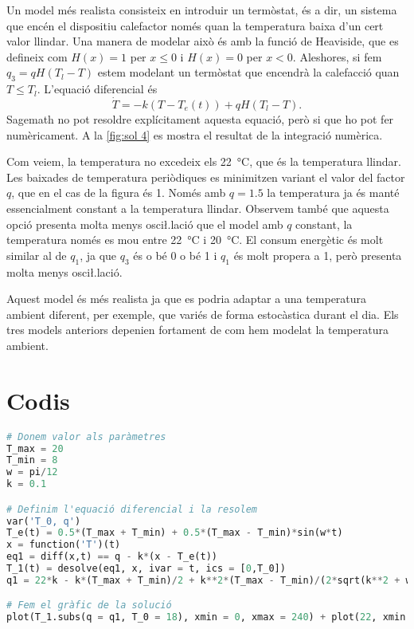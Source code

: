 \documentclass[12pt]{article}
\numberwithin{table}{section}
\numberwithin{figure}{section}
\numberwithin{equation}{section}
\begin{document}
Un model més realista consisteix en introduir un termòstat, és a dir, un sistema que encén el dispositiu calefactor només quan la temperatura baixa d'un cert valor llindar. Una manera de modelar això és amb la funció de Heaviside, que es defineix com \( H(x) = 1 \) per \( x \leq 0 \) i \( H(x) = 0 \) per \( x < 0 \). Aleshores, si fem \( q_3 = qH(T_l - T) \) estem modelant un termòstat que encendrà la calefacció quan \( T \leq T_l \). L'equació diferencial és
\begin{equation*}
	\dot{T} = -k(T - T_e(t)) + qH(T_l - T).
\end{equation*}
Sagemath no pot resoldre explícitament aquesta equació, però si que ho pot fer numèricament. A la \cref{fig:sol 4} es mostra el resultat de la integració numèrica. 

Com veiem, la temperatura no excedeix els \SI{22}{\celsius}, que és la temperatura llindar. Les baixades de temperatura periòdiques es minimitzen variant el valor del factor \( q \), que en el cas de la figura és 1. Només amb \( q = 1.5 \) la temperatura ja és manté essencialment constant a la temperatura llindar. Observem també que aquesta opció presenta molta menys osci\l.lació que el model amb \( q \) constant, la temperatura només es mou entre \SI{22}{\celsius} i \SI{20}{\celsius}. El consum energètic és molt similar al de \( q_1 \), ja que \( q_3 \) és o bé 0 o bé 1 i \( q_1 \) és molt propera a 1, però presenta molta menys osci\l.lació.

Aquest model és més realista ja que es podria adaptar a una temperatura ambient diferent, per exemple, que variés de forma estocàstica durant el dia. Els tres models anteriors depenien fortament de com hem modelat la temperatura ambient.

\appendix
\section{Codis}
\begin{lstlisting}[language=python, caption=Codi per simular el model amb \( q_1 \), label={lst:codi 1}]
# Donem valor als paràmetres
T_max = 20
T_min = 8
w = pi/12
k = 0.1

# Definim l'equació diferencial i la resolem
var('T_0, q')
T_e(t) = 0.5*(T_max + T_min) + 0.5*(T_max - T_min)*sin(w*t)
x = function('T')(t)
eq1 = diff(x,t) == q - k*(x - T_e(t))
T_1(t) = desolve(eq1, x, ivar = t, ics = [0,T_0])
q1 = 22*k - k*(T_max + T_min)/2 + k**2*(T_max - T_min)/(2*sqrt(k**2 + w**2))

# Fem el gràfic de la solució
plot(T_1.subs(q = q1, T_0 = 18), xmin = 0, xmax = 240) + plot(22, xmin = 0, xmax = 240, color = 'green', linestyle = '--')
\end{lstlisting}
\end{document}

